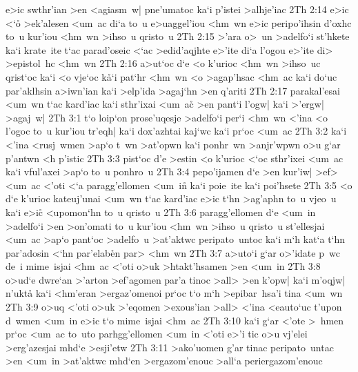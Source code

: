 e>ic
swthr'ian
>en
<agiasm~w|
pne'umatoc
ka`i
p'istei
>alhje'iac\bibvsend
\vs 2Th 2:14
e>ic
<`o\r{}
>ek'alesen
<um~ac
di`a
to~u
e>uaggel'iou
<hm~wn
e>ic
peripo'ihsin
d'oxhc
to~u
kur'iou
<hm~wn
>ihso~u
qristo~u\bibvsend
\vs 2Th 2:15
>'ara
o>~un
>adelfo`i
st'hkete
ka`i
krate~ite
t`ac
parad'oseic
<`ac
>edid'aqjhte
e>'ite
di`a
l'ogou
e>'ite
di>
>epistol~hc
<hm~wn\bibvsend
\vs 2Th 2:16
a>ut`oc
d`e
<o
k'urioc
<hm~wn
>ihso~uc
qrist`oc
ka`i
<o
vje`oc
k\r{a}`i
pat`hr
<hm~wn
<o
>agap'hsac
<hm~ac
ka`i
do`uc
par'aklhsin
a>iwn'ian
ka`i
>elp'ida
>agaj`hn
>en
q'ariti\bibvsend
\vs 2Th 2:17
parakal'esai
<um~wn
t`ac
kard'iac
ka`i
sthr'ixai
<um~ac\r{}
>en
pant`i
l'ogw|
ka`i
>'ergw|
>agaj~w|\bibvsend
\vs 2Th 3:1
t`o
loip`on
prose'uqesje
>adelfo`i
per`i
<hm~wn
<'ina
<o
l'ogoc
to~u
kur'iou
tr'eqh|
ka`i
dox'azhtai
kaj`wc
ka`i
pr`oc
<um~ac\bibvsend
\vs 2Th 3:2
ka`i
<'ina
<rusj~wmen
>ap`o
t~wn
>at'opwn
ka`i
ponhr~wn
>anjr'wpwn
o>u
g`ar
p'antwn
<h
p'istic\bibvsend
\vs 2Th 3:3
pist`oc
d'e
>estin
<o
k'urioc
<`oc
sthr'ixei
<um~ac
ka`i
vful'axei
>ap`o
to~u
ponhro~u\bibvsend
\vs 2Th 3:4
pepo'ijamen
d`e
>en
kur'iw|
>ef>
<um~ac
<'oti
<`a
paragg'ellomen
<um~in\r{}
ka`i
poie~ite
ka`i
poi'hsete\bibvsend
\vs 2Th 3:5
<o
d`e
k'urioc
kateuj'unai
<um~wn
t`ac
kard'iac
e>ic
t`hn
>ag'aphn
to~u
vjeo~u
ka`i
e>i\r{c}
<upomon`hn
to~u
qristo~u\bibvsend
\vs 2Th 3:6
paragg'ellomen
d`e
<um~in
>adelfo`i
>en
>on'omati
to~u
kur'iou
<hm~wn
>ihso~u
qristo~u
st'ellesjai
<um~ac
>ap`o
pant`oc
>adelfo~u
>at'aktwc
peripato~untoc
ka`i
m`h
kat`a
t`hn
par'adosin
<`hn
par'elab\r{e}n
par>
<hm~wn\bibvsend
\vs 2Th 3:7
a>uto`i
g`ar
o>'idate
p~wc
de~i
mime~isjai
<hm~ac
<'oti
o>uk
>htakt'hsamen
>en
<um~in\bibvsend
\vs 2Th 3:8
o>ud`e
dwre`an
>'arton
>ef'agomen
par'a
tinoc
>all>
>en
k'opw|
ka`i
m'oqjw|
n'ukta\r{}
ka`i
<hm'eran
>ergaz'omenoi
pr`oc
t`o
m`h
>epibar~hsa'i
tina
<um~wn\bibvsend
\vs 2Th 3:9
o>uq
<'oti
o>uk
>'eqomen
>exous'ian
>all>
<'ina
<eauto`uc
t'upon
d~wmen
<um~in
e>ic
t`o
mime~isjai
<hm~ac\bibvsend
\vs 2Th 3:10
ka`i
g`ar
<'ote
>~hmen
pr`oc
<um~ac
to~uto
parhgg'ellomen
<um~in
<'oti
e>'i
tic
o>u
vj'elei
>erg'azesjai
mhd`e
>esji'etw\bibvsend
\vs 2Th 3:11
>ako'uomen
g'ar
tinac
peripato~untac
>en
<um~in
>at'aktwc
mhd`en
>ergazom'enouc
>all`a
periergazom'enouc\bibvsend
